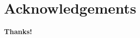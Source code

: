 \cleardoublepage
\chapter*{\vspace{-1.5cm}Acknowledgements}



\vspace{1cm}

%
 \begin{minipage}[l]{0.5\textwidth}
		\vspace{-2cm}
    \textbf{Thanks!}
  \end{minipage}
	\hfill
  \begin{minipage}[r]{3.7cm}
		\vspace{0pt}
  \end{minipage}



